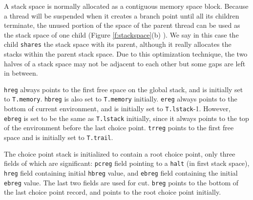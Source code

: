 \documentclass[11pt]{article}
\begin{document}
A stack space is normally allocated as a contiguous memory space
block.  Because a thread will be suspended when it creates a branch
point until all its children terminate, the unused portion of the
space of the parent thread can be used as the stack space of one child
(Figure \ref{f:stackspace}(b) ). We say in this case the child
{\tt shares} the stack space with its parent, although it really
allocates the stacks within the parent stack space.  Due to this
optimization technique, the two halves of a stack space may not be
adjacent to each other but some gaps are left in between.


{\tt hreg} always points to the first free space on the global stack,
and is initially set to {\tt T.memory}.  {\tt hbreg} is also set to
{\tt T.memory} initially.  {\tt ereg} always points to the bottom of
current environment, and is initially set to {\tt T.lstack}-1.
However, {\tt ebreg} is set to be the same as {\tt T.lstack}
initially, since it always points to the top of the environment before
the last choice point.  {\tt trreg} points to the first free space and
is initially set to {\tt T.trail}.

The choice point stack is initialized to contain a root choice point,
only three fields of which are significant: {\tt pcreg} field pointing
to a {\tt halt} (in first stack space), {\tt hreg} field containing
initial {\tt hbreg} value, and {\tt ebreg} field containing the
initial {\tt ebreg} value.  The last two fields are used for cut.
{\tt breg} points to the bottom of the last choice point record, and
points to the root choice point initially.
\end{document}
